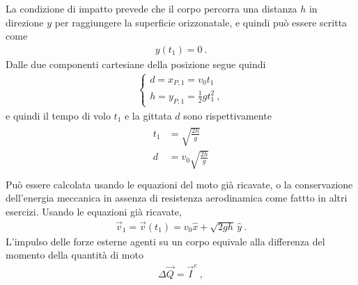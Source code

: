 \documentclass[letterpaper,10pt,italian]{jupyterBook}
\begin{document}
\sphinxAtStartPar
{} La condizione di impatto prevede che il corpo percorra una distanza \(h\) in direzione \(y\) per raggiungere la superficie orizzonatale, e quindi può essere scritta come
\begin{equation*}
\begin{split}y(t_1) = 0 \ .\end{split}
\end{equation*}
\sphinxAtStartPar
Dalle due componenti cartesiane della posizione segue quindi
\begin{equation*}
\begin{split}\begin{cases}
  d = x_{P,1} = v_0 t_1  \\
  h = y_{P,1} = \frac{1}{2} g t_1^2 \ ,
\end{cases}\end{split}
\end{equation*}
\sphinxAtStartPar
e quindi il tempo di volo \(t_1\) e la gittata \(d\) sono rispettivamente
\begin{equation*}
\begin{split}\begin{aligned}
  t_1 & = \sqrt{\frac{2 h}{g}} \\
  d   & = v_0 \sqrt{\frac{2 h}{g}} \\
\end{aligned}\end{split}
\end{equation*}
\sphinxAtStartPar
{} Può essere calcolata usando le equazioni del moto già ricavate, o la conservazione dell’energia meccanica \sphinxhyphen{} in assenza di resistenza aerodinamica \sphinxhyphen{} come fattto in altri esercizi. Usando le equazioni già ricavate,
\begin{equation*}
\begin{split}\vec{v}_1 = \vec{v}(t_1) = v_0 \hat{x} + \sqrt{2 g h } \, \hat{y} \ .\end{split}
\end{equation*}
\sphinxAtStartPar
{} L’impulso delle forze esterne agenti su un corpo equivale alla differenza del momento della quantità di moto  
\begin{equation*}
\begin{split}\Delta \vec{Q} = \vec{I}^e \ ,\end{split}
\end{equation*}
\end{document}
